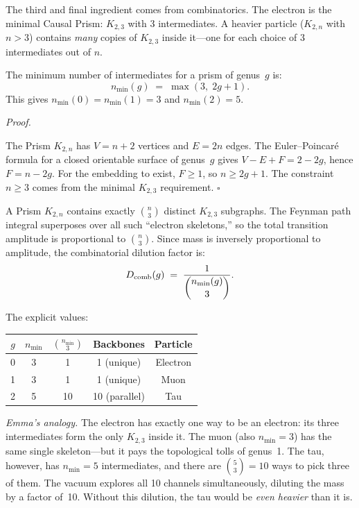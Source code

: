 \documentclass[11pt, a4paper, openany]{book}
\newcounter{thm}[chapter]
\renewenvironment{proof}[1][Proof]{%
  \par\noindent\textit{#1.}\quad
}{\hfill$\square$\par\medskip}
\begin{document}
The third and final ingredient comes from combinatorics. The
electron is the minimal Causal Prism: $K_{2,3}$ with 3
intermediates. A heavier particle ($K_{2,n}$ with $n > 3$) contains
\emph{many} copies of $K_{2,3}$ inside it---one for each choice of
3 intermediates out of $n$.

\begin{theorem}
\label{thm:euler-floor}
The minimum number of intermediates for a prism of genus~$g$
is:
\[
  n_{\min}(g) \;=\; \max(3,\; 2g + 1).
\]
This gives $n_{\min}(0) = n_{\min}(1) = 3$ and
$n_{\min}(2) = 5$.
\end{theorem}

\begin{proof}
The Prism $K_{2,n}$ has $V = n+2$ vertices and $E = 2n$ edges.
The Euler--Poincar\'e formula for a closed orientable surface
of genus~$g$ gives $V - E + F = 2 - 2g$, hence
$F = n - 2g$. For the embedding to exist, $F \ge 1$, so
$n \ge 2g + 1$. The constraint $n \ge 3$ comes from the minimal
$K_{2,3}$ requirement.
\end{proof}

\begin{theorem}
\label{thm:subgraph-super}
A Prism $K_{2,n}$ contains exactly $\binom{n}{3}$ distinct
$K_{2,3}$ subgraphs. The Feynman path integral superposes over
all such ``electron skeletons,'' so the total transition amplitude
is proportional to $\binom{n}{3}$. Since mass is inversely
proportional to amplitude, the combinatorial dilution factor is:
\[
  D_{\mathrm{comb}}(g) \;=\; \frac{1}{\dbinom{n_{\min}(g)}{3}}.
\]
\end{theorem}

\noindent The explicit values:

\begin{center}
\renewcommand{\arraystretch}{1.3}
\begin{tabular}{ccccc}
\toprule
$g$ & $n_{\min}$ & $\binom{n_{\min}}{3}$ & Backbones & Particle \\
\midrule
0 & 3 & 1  & 1 (unique)     & Electron \\
1 & 3 & 1  & 1 (unique)     & Muon \\
2 & 5 & 10 & 10 (parallel)  & Tau \\
\bottomrule
\end{tabular}
\end{center}

\smallskip\noindent
\textit{Emma's analogy.}
The electron has exactly one way to be an electron: its three
intermediates form the only $K_{2,3}$ inside it. The muon
(also $n_{\min} = 3$) has the same single skeleton---but it
pays the topological tolls of genus~1. The tau, however, has
$n_{\min} = 5$ intermediates, and there are $\binom{5}{3} = 10$
ways to pick three of them. The vacuum explores all 10 channels
simultaneously, diluting the mass by a factor of~10. Without
this dilution, the tau would be \emph{even heavier} than it is.
\end{document}
